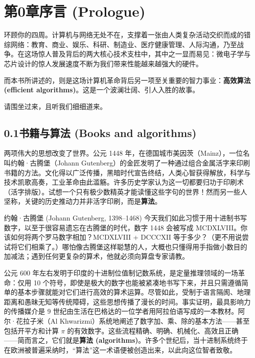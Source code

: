 \chapter*{第0章\quad 序言 (Prologue)}

环顾你的四周。计算机与网络无处不在，支撑着一张由人类复杂活动交织而成的错综网络：教育、商业、娱乐、科研、制造业、医疗健康管理、人际沟通，乃至战争。在这场惊人普及背后的两大核心技术支柱中，其中之一显而易见：微电子学与芯片设计的惊人发展速度不断为我们带来性能越来越强大的硬件。

而本书所讲述的，则是这场计算机革命背后另一项至关重要的智力事业：\textbf{高效算法 (efficient algorithms)}。这是一个波澜壮阔、引人入胜的故事。

请围坐过来，且听我们细细道来。

\section*{0.1\quad 书籍与算法 (Books and algorithms)}

两项伟大的思想改变了世界。公元 1448 年，在德国城市美因茨（Mainz），一位名叫约翰·古腾堡（Johann Gutenberg）的金匠发明了一种通过组合金属活字来印刷书籍的方法。文化得以广泛传播，黑暗时代宣告终结，人类心智获得解放，科学与技术凯歌高奏，工业革命由此滥觞。许多历史学家认为这一切都要归功于印刷术（活字排版）。试想一个只有极少数精英才能读懂这些字句的世界！然而另一些人坚称，关键的历史推动力并非活字印刷，而是\textbf{算法}。

\begin{sidebarbox}{约翰·古腾堡 (Johann Gutenberg, 1398--1468)}
今天我们如此习惯于用十进制书写数字，以至于很容易遗忘在古腾堡的时代，数字 1448 会被写成 MCDXLVIII。你该如何将两个罗马数字相加？MCDXLVIII + DCCCXII 等于多少？（更不用说尝试将它们相乘了。）哪怕像古腾堡这样聪慧的人，大概也只懂得用手指做小数目的加减法；遇到任何更复杂的算术，他就必须向算盘专家请教。
\end{sidebarbox}

公元 600 年左右发明于印度的十进制位值制记数系统，是定量推理领域的一场革命：仅用 10 个符号，即使是极大的数字也能被紧凑地书写下来，并且只需遵循简单的基本步骤就能对它们进行高效的算术运算。尽管如此，受制于语言隔阂、地理距离和愚昧无知等传统障碍，这些思想传播了漫长的时间。事实证明，最具影响力的传播媒介是 9 世纪由生活在巴格达的一位学者用阿拉伯语写成的一本教材。阿尔·花拉子米（Al Khwarizmi）系统地阐述了数字加、乘、除的基本方法——甚至包括开平方和计算 $\pi$ 的有效数字。这些流程精确、明确、机械化、高效且正确——简而言之，它们就是\textbf{算法 (algorithms)}。许多个世纪后，当十进制系统终于在欧洲被普遍采纳时，“算法”这一术语便被创造出来，以此向这位智者致敬。

